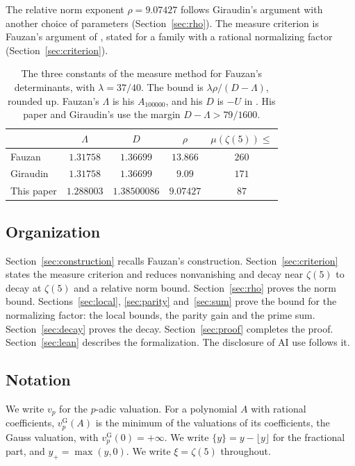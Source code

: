 \documentclass[11pt]{amsart}
\theoremstyle{definition}
\theoremstyle{remark}
\numberwithin{equation}{section}
\newcommand{\vG}{v_p^{\mathrm G}}
\newcommand{\fr}[1]{\{#1\}}
\begin{document}
The relative norm exponent $\rho=9.07427$ follows Giraudin's argument \cite{Giraudin26z5} with another choice of
parameters (Section~\ref{sec:rho}). The measure criterion is Fauzan's argument of \cite[Appendix~C]{Fauzan2026},
stated for a family with a rational normalizing factor (Section~\ref{sec:criterion}).

\begin{table}[ht]
\centering
\renewcommand{\arraystretch}{1.2}
\begin{tabular}{@{}lcccc@{}}
\toprule
 & $\Lambda$ & $D$ & $\rho$ & $\mu(\zeta(5))\le$\\
\midrule
Fauzan \cite{Fauzan2026} & $1.31758$ & $1.36699$ & $13.866$ & $260$\\
Giraudin \cite{Giraudin26z5} & $1.31758$ & $1.36699$ & $9.09$ & $171$\\
This paper & $1.288003$ & $1.38500086$ & $9.07427$ & $87$\\
\bottomrule
\end{tabular}
\caption{The three constants of the measure method for Fauzan's determinants, with $\lambda=37/40$. The bound is
$\lambda\rho/(D-\Lambda)$, rounded up. Fauzan's $\Lambda$ is his $A_{100000}$, and his $D$ is $-U$ in
\cite[(6.4)]{Fauzan2026}. His paper and Giraudin's use the margin $D-\Lambda>79/1600$.}\label{tab:constants}
\end{table}

\subsection{Organization}
Section~\ref{sec:construction} recalls Fauzan's construction. Section~\ref{sec:criterion} states the measure criterion
and reduces nonvanishing and decay near $\zeta(5)$ to decay at $\zeta(5)$ and a relative norm bound.
Section~\ref{sec:rho} proves the norm bound. Sections~\ref{sec:local}, \ref{sec:parity} and~\ref{sec:sum} prove the
bound for the normalizing factor: the local bounds, the parity gain and the prime sum. Section~\ref{sec:decay} proves
the decay. Section~\ref{sec:proof} completes the proof. Section~\ref{sec:lean} describes the formalization. The
disclosure of AI use follows it.

\subsection{Notation}
We write $v_p$ for the $p$-adic valuation. For a polynomial $A$ with rational coefficients, $\vG(A)$ is the minimum
of the valuations of its coefficients, the Gauss valuation, with $\vG(0)=+\infty$. We write $\fr y=y-\lfloor y\rfloor$
for the fractional part, and $y_+=\max(y,0)$. We write $\xi=\zeta(5)$ throughout.
\end{document}
